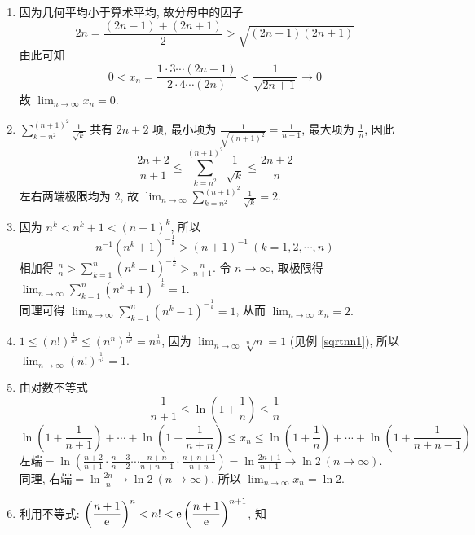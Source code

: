 \begin{solution}
    \begin{enumerate}[label=(\arabic{*})]
        \item 因为几何平均小于算术平均, 故分母中的因子
              $$2n=\frac{(2n-1)+(2n+1)}{2}>\sqrt{(2n-1)(2n+1)}$$
              由此可知 $$0<x_n=\frac{1\cdot3\cdots(2n-1)}{2\cdot4\cdots(2n)}<\frac{1}{\sqrt{2n+1}}\to0$$
              故 $\displaystyle\lim_{n\to\infty}x_n=0.$
        \item $\displaystyle\sum_{k=n^2}^{(n+1)^2}\frac{1}{\sqrt{k}}$ 共有 $2n+2$ 项, 最小项为 $\displaystyle\frac{1}{\sqrt{(n+1)^2}}=\frac{1}{n+1}$,
              最大项为 $\displaystyle\frac{1}{n}$, 因此
              $$\frac{2n+2}{n+1}\leqslant\sum_{k=n^2}^{(n+1)^2}\frac{1}{\sqrt{k}}\leqslant\frac{2n+2}{n}$$
              左右两端极限均为 $2$, 故 $\displaystyle\lim_{n\to\infty}\sum_{k=n^2}^{(n+1)^2}\frac{1}{\sqrt{k}}=2.$
        \item 因为 $n^k<n^k+1<(n+1)^k$, 所以
              $$n^{-1}(n^k+1)^{-\frac{1}{k}}>(n+1)^{-1}~ (k=1,2,\cdots,n)$$
              相加得 $\displaystyle\frac{n}{n}>\sum_{k=1}^{n}(n^k+1)^{-\frac{1}{k}}>\frac{n}{n+1}$.
              令 $n\to\infty$, 取极限得 $\displaystyle\lim_{n\to\infty}\sum_{k=1}^{n}(n^k+1)^{-\frac{1}{k}}=1$.\\
              同理可得 $\displaystyle\lim_{n\to\infty}\sum_{k=1}^{n}(n^k-1)^{-\frac{1}{k}}=1$, 从而 $\displaystyle\lim_{n\to\infty}x_n=2.$
        \item $\displaystyle 1\leqslant (n!)^{\frac{1}{n^2}}\leqslant (n^n)^{\frac{1}{n^2}}=n^{\frac{1}{n}}$, 因为 $\displaystyle\lim_{n\to\infty}\sqrt[n]{n}=1$ (见例 \ref{sqrtnn1}),
              所以 $\displaystyle\lim_{n\to\infty}(n!)^{\frac{1}{n^2}}=1.$
        \item 由对数不等式 $$\frac{1}{n+1}\leqslant\ln\left(1+\frac{1}{n}\right)\leqslant\frac{1}{n}$$
              $$\ln\left(1+\frac{1}{n+1}\right)+\cdots+\ln\left(1+\frac{1}{n+n}\right)\leqslant x_n\leqslant \ln\left(1+\frac{1}{n}\right)+\cdots+\ln\left(1+\frac{1}{n+n-1}\right)$$
              $\displaystyle\text{左端}=\ln\left(\frac{n+2}{n+1}\cdot\frac{n+3}{n+2}\cdots\frac{n+n}{n+n-1}\cdot\frac{n+n+1}{n+n}\right)=\ln\frac{2n+1}{n+1}\to\ln2~ (n\to\infty)$.\\
              同理, 右端$=\displaystyle\ln\frac{2n}{n}\to\ln2~ (n\to\infty)$, 所以 $\displaystyle\lim_{n\to\infty}x_n=\ln 2.$
        \item 利用不等式: $\displaystyle\left(\frac{n+1}{\mathrm{e} }\right)^n< n!<\mathrm{e} \left(\frac{n+1}{\mathrm{e} }\right)^{n+1}$, 知

\end{enumerate}
\end{solution}
